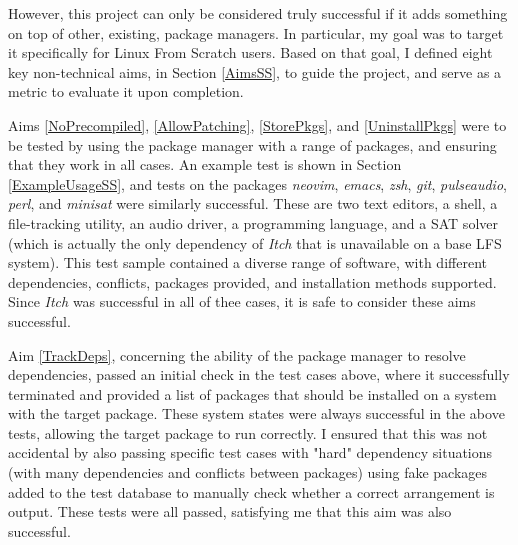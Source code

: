 \documentclass[10pt]{article}
\begin{document}
However, this project can only be considered truly successful if it adds something on top of other, existing, package managers. In particular, my goal was to target it specifically for Linux From Scratch users. Based on that goal, I defined eight key non-technical aims, in Section \ref{AimsSS}, to guide the project, and serve as a metric to evaluate it upon completion.

Aims \ref{NoPrecompiled}, \ref{AllowPatching}, \ref{StorePkgs}, and \ref{UninstallPkgs} were to be tested by using the package manager with a range of packages, and ensuring that they work in all cases. An example test is shown in Section \ref{ExampleUsageSS}, and tests on the packages \textit{neovim}, \textit{emacs}, \textit{zsh}, \textit{git}, \textit{pulseaudio}, \textit{perl}, and \textit{minisat} were similarly successful. These are two text editors, a shell, a file-tracking utility, an audio driver, a programming language, and a SAT solver (which is actually the only dependency of \textit{Itch} that is unavailable on a base LFS system). This test sample contained a diverse range of software, with different dependencies, conflicts, packages provided, and installation methods supported. Since \textit{Itch} was successful in all of thee cases, it is safe to consider these aims successful.

Aim \ref{TrackDeps}, concerning the ability of the package manager to resolve dependencies, passed an initial check in the test cases above, where it successfully terminated and provided a list of packages that should be installed on a system with the target package. These system states were always successful in the above tests, allowing the target package to run correctly. I ensured that this was not accidental by also passing specific test cases with "hard" dependency situations (with many dependencies and conflicts between packages) using fake packages added to the test database to manually check whether a correct arrangement is output. These tests were all passed, satisfying me that this aim was also successful.
\end{document}
